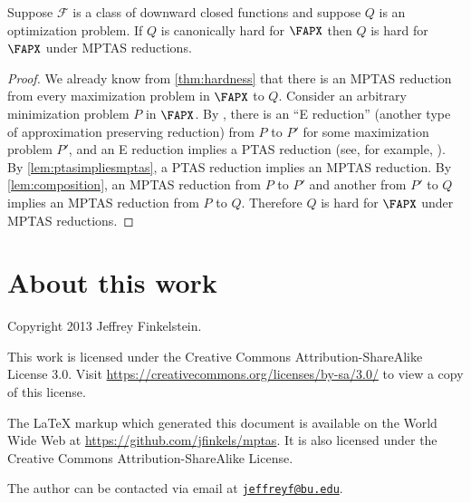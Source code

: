 \documentclass{article}
\newcommand{\email}[1]{\href{mailto:#1}{\nolinkurl{#1}}}
\begin{document}
\begin{corollary}
  Suppose $\mathcal{F}$ is a class of downward closed functions and suppose $Q$ is an optimization problem.
  If $Q$ is canonically hard for $\FAPX$ then $Q$ is hard for $\FAPX$ under MPTAS reductions.
\end{corollary}
\begin{proof}
  We already know from \autoref{thm:hardness} that there is an MPTAS reduction from every maximization problem in $\FAPX$ to $Q$.
  Consider an arbitrary minimization problem $P$ in $\FAPX$.
  By \cite{ep06}, there is an ``E reduction'' (another type of approximation preserving reduction) from $P$ to $P'$ for some maximization problem $P'$, and an E reduction implies a PTAS reduction (see, for example, \cite[Figure~2]{crescenzi97}).
  By \autoref{lem:ptasimpliesmptas}, a PTAS reduction implies an MPTAS reduction.
  By \autoref{lem:composition}, an MPTAS reduction from $P$ to $P'$ and another from $P'$ to $Q$ implies an MPTAS reduction from $P$ to $Q$.
  Therefore $Q$ is hard for $\FAPX$ under MPTAS reductions.
\end{proof}

\section*{About this work}

Copyright 2013 Jef{}frey Finkelstein.

This work is licensed under the Creative Commons Attribution-ShareAlike License 3.0.
Visit \mbox{\url{https://creativecommons.org/licenses/by-sa/3.0/}} to view a copy of this license.

The \LaTeX{} markup which generated this document is available on the World Wide Web at \mbox{\url{https://github.com/jfinkels/mptas}}.
It is also licensed under the Creative Commons Attribution-ShareAlike License.

The author can be contacted via email at \email{jeffreyf@bu.edu}.



\end{document}
